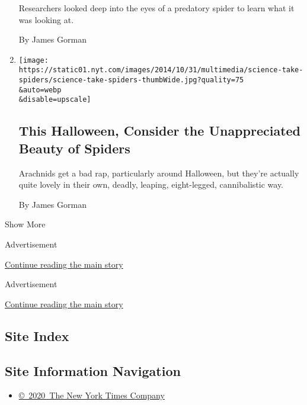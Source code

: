 \begin{enumerate}
  Researchers looked deep into the eyes of a predatory spider to learn
  what it was looking at.

  By James Gorman
\item
  \href{/2018/10/31/science/spiders-halloween.html}{}

  \texttt{[image: https://static01.nyt.com/images/2014/10/31/multimedia/science-take-spiders/science-take-spiders-thumbWide.jpg?quality=75\\\&auto=webp\\\&disable=upscale]}

  \hypertarget{this-halloween-consider-the-unappreciated-beauty-of-spiders}{%
  \subsection{This Halloween, Consider the Unappreciated Beauty of
  Spiders}\label{this-halloween-consider-the-unappreciated-beauty-of-spiders}}

  Arachnids get a bad rap, particularly around Halloween, but they're
  actually quite lovely in their own, deadly, leaping, eight-legged,
  cannibalistic way.

  By James Gorman
\end{enumerate}

Show More

Advertisement

\protect\hyperlink{after-mid1}{Continue reading the main story}

Advertisement

\protect\hyperlink{after-mktg}{Continue reading the main story}

\hypertarget{site-index}{%
\subsection{Site Index}\label{site-index}}

\hypertarget{site-information-navigation}{%
\subsection{Site Information
Navigation}\label{site-information-navigation}}

\begin{itemize}
\tightlist
\item
  \href{https://help.nytimes.com/hc/en-us/articles/115014792127-Copyright-notice}{©~2020~The
  New York Times Company}
\end{itemize}

